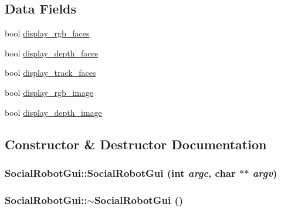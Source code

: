 \subsection*{Data Fields}
\begin{DoxyCompactItemize}
\item 
bool \hyperlink{classSocialRobotGui_a57c8e1f9be7edfe29703853268aa8aba}{display\_\-rgb\_\-faces}
\item 
bool \hyperlink{classSocialRobotGui_a1d32e49a34a1a0eafe6a7e160307bf82}{display\_\-depth\_\-faces}
\item 
bool \hyperlink{classSocialRobotGui_a28e6dc7627b92c85adb014bcaeb641bd}{display\_\-track\_\-faces}
\item 
bool \hyperlink{classSocialRobotGui_a29d1ccc0fd91a27bdd56364aef82d351}{display\_\-rgb\_\-image}
\item 
bool \hyperlink{classSocialRobotGui_aec418c0fe6ac3e995e2fedda35d0237e}{display\_\-depth\_\-image}
\end{DoxyCompactItemize}


\subsection{Constructor \& Destructor Documentation}
\hypertarget{classSocialRobotGui_a5eaed12731bfb6967d261ae8433d2110}{
\subsubsection[{SocialRobotGui}]{\setlength{\rightskip}{0pt plus 5cm}SocialRobotGui::SocialRobotGui (int {\em argc}, \/  char $\ast$$\ast$ {\em argv})}}
\label{classSocialRobotGui_a5eaed12731bfb6967d261ae8433d2110}
\hypertarget{classSocialRobotGui_afd21dde21c5d13e302cec9edda1e9abc}{
\subsubsection[{$\sim$SocialRobotGui}]{\setlength{\rightskip}{0pt plus 5cm}SocialRobotGui::$\sim$SocialRobotGui ()}}
\label{classSocialRobotGui_afd21dde21c5d13e302cec9edda1e9abc}


